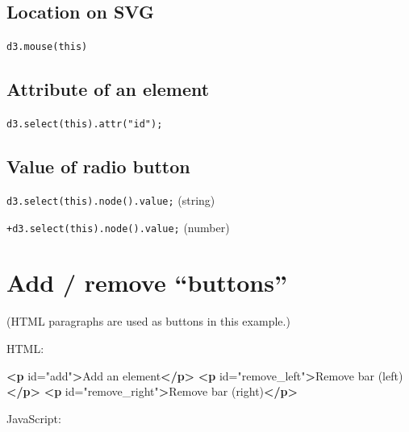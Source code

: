 \documentclass[openany]{book}
\newenvironment{Shaded}{\begin{snugshade}}{\end{snugshade}}
\newcommand{\KeywordTok}[1]{\textcolor[rgb]{0.13,0.29,0.53}{\textbf{#1}}}
\newcommand{\NormalTok}[1]{#1}
\newcommand{\OtherTok}[1]{\textcolor[rgb]{0.56,0.35,0.01}{#1}}
\newcommand{\StringTok}[1]{\textcolor[rgb]{0.31,0.60,0.02}{#1}}
\begin{document}
\hypertarget{location-on-svg}{%
\subsection{Location on SVG}\label{location-on-svg}}

\texttt{d3.mouse(this)}

\hypertarget{attribute-of-an-element}{%
\subsection{Attribute of an element}\label{attribute-of-an-element}}

\texttt{d3.select(this).attr("id");}

\hypertarget{value-of-radio-button}{%
\subsection{Value of radio button}\label{value-of-radio-button}}

\texttt{d3.select(this).node().value;} (string)

\texttt{+d3.select(this).node().value;} (number)

\hypertarget{add-remove-buttons}{%
\section{Add / remove ``buttons''}\label{add-remove-buttons}}

(HTML paragraphs are used as buttons in this example.)

HTML:

\begin{Shaded}
\begin{Highlighting}[]
\KeywordTok{<p}\OtherTok{ id=}\StringTok{"add"}\KeywordTok{>}\NormalTok{Add an element}\KeywordTok{</p>}
\KeywordTok{<p}\OtherTok{ id=}\StringTok{"remove_left"}\KeywordTok{>}\NormalTok{Remove bar (left)}\KeywordTok{</p>}
\KeywordTok{<p}\OtherTok{ id=}\StringTok{"remove_right"}\KeywordTok{>}\NormalTok{Remove bar (right)}\KeywordTok{</p>}
\end{Highlighting}
\end{Shaded}

JavaScript:
\end{document}
